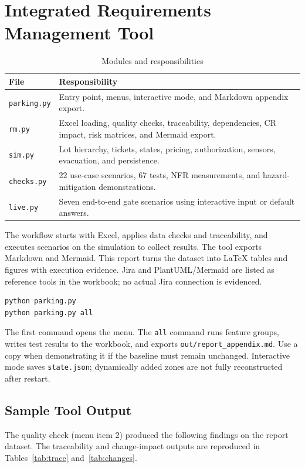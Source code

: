 \section{Integrated Requirements Management Tool}
\begin{table}[H]\centering\small\caption{Modules and responsibilities}
\begin{tabularx}{\linewidth}{L{28mm}X}\toprule
File & Responsibility\\\midrule
\texttt{parking.py} & Entry point, menus, interactive mode, and Markdown appendix export.\\
\texttt{rm.py} & Excel loading, quality checks, traceability, dependencies, CR impact, risk matrices, and Mermaid export.\\
\texttt{sim.py} & Lot hierarchy, tickets, states, pricing, authorization, sensors, evacuation, and persistence.\\
\texttt{checks.py} & 22 use-case scenarios, 67 tests, NFR measurements, and hazard-mitigation demonstrations.\\
\texttt{live.py} & Seven end-to-end gate scenarios using interactive input or default answers.\\\bottomrule
\end{tabularx}\end{table}
The workflow starts with Excel, applies data checks and traceability, and executes scenarios on the simulation to collect results. The tool exports Markdown and Mermaid. This report turns the dataset into LaTeX tables and figures with execution evidence. Jira and PlantUML/Mermaid are listed as reference tools in the workbook; no actual Jira connection is evidenced.

\begin{Verbatim}[fontsize=\small,frame=single]
python parking.py
python parking.py all
\end{Verbatim}
The first command opens the menu. The \texttt{all} command runs feature groups, writes test results to the workbook, and exports \texttt{out/report\_appendix.md}. Use a copy when demonstrating it if the baseline must remain unchanged. Interactive mode saves \texttt{state.json}; dynamically added zones are not fully reconstructed after restart.

\subsection*{Sample Tool Output}
The quality check (menu item 2) produced the following findings on the report dataset. The traceability and change-impact outputs are reproduced in Tables~\ref{tab:trace} and~\ref{tab:changes}.

